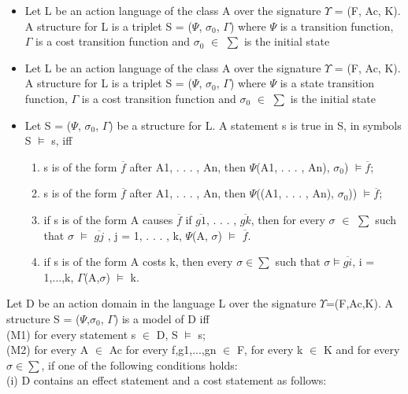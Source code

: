 \documentclass[11pt]{article}
\begin{document}
\begin{itemize}
\begin{enumerate}
\end{enumerate}

\item 	Let L be an action language of the class A over the signature $\Upsilon$ = (F, Ac, K). A structure for L is a triplet S = ($\Psi$, $\sigma_{0}$, $\Gamma$) where $\Psi$ is a transition function, $\Gamma$ is a cost transition function  and $\sigma_{0}$ $\in$ $\sum$ is the initial state
\item 	Let L be an action language of the class A over the signature $\Upsilon$ = (F, Ac, K). A structure for L is a triplet S = ($\Psi$, $\sigma_{0}$, $\Gamma$) where $\Psi$ is a state transition function, $\Gamma$ is a cost transition function  and $\sigma_{0}$ $\in$ $\sum$ is the initial state

\item 	Let S = ($\Psi$, $\sigma_{0}$, $\Gamma$) be a structure for L. A statement s is true in S, in symbols S   $\vDash$   s, iff 
\begin{enumerate}
\item s is of the form $\overline{f}$ after A1, . . . , An, then $\Psi$(A1, . . . , An), $\sigma_{0}$)   $\vDash \overline{f}$;
\item s is of the form $\overline{f}$ after A1, . . . , An, then $\Psi$((A1, . . . , An), $\sigma_{0}$))   $\vDash \overline{f}$;

\item if s is of the form A causes $\overline{f}$ if $\overline{g1}$, . . . , $\overline{gk}$, then for every $\sigma$ $\in$ $\sum$ such that $\sigma$   $\vDash$   $\overline{gj}$ , j = 1, . . . , k, $\Psi$(A, $\sigma$)   $\vDash$   $\overline{f}$.

\item if s is of the form A costs k, then every $\sigma \in \sum$ such that $\sigma \vDash \overline{gi}$, i = 1,...,k, $\Gamma$(A,$\sigma$) $\vDash$ k.
\end{enumerate}
 

\end{itemize}
Let D be an action domain in the language L over the signature $\Upsilon$=(F,Ac,K). A structure S = ($\Psi$,$\sigma_{0}$, $\Gamma$) is a model of D iff\\
(M1) for every statement s $\in$ D, S $\vDash$ s;\\
(M2) for every A $\in$ Ac for every f,g1,...,gn $\in$ F, for every k $\in$ K and for every $\sigma\in\sum$, if one of the following conditions holds:
\\
(i) D contains an effect statement and a cost statement as follows:
\end{document}
